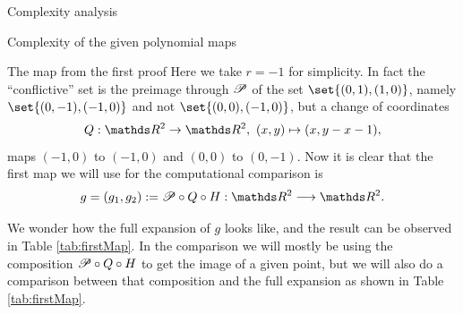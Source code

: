 \documentclass[11pt, a4paper, english, twoside, notitlepage, openright]{report}
\begin{document}
\begin{chapter}{Complexity analysis}
\begin{section}{Complexity of the given polynomial maps}
\begin{subsection}{The map from the first proof}
Here we take $r=-1$ for simplicity. In fact the ``conflictive'' set is the preimage through $\P$ of the set $\set{(0,1),(1,0)}$, namely $\set{(0,-1),(-1,0)}$ and not $\set{(0,0),(-1,0)}$, but a change of coordinates 
$$
Q:\R^2\to\R^2,\ (x,y)\mapsto(x,y-x-1),
$$
maps $(-1,0)$ to $(-1,0)$ and $(0,0)$ to $(0,-1)$. Now it is clear that the first map we will use for the computational comparison is
$$
g=(g_1, g_2):=\P\circ Q\circ H:\R^2\longrightarrow\R^2.
$$

We wonder how the full expansion of $g$ looks like, and the result can be observed in Table \ref{tab:firstMap}. In the comparison we will mostly be using the composition $\P\circ Q\circ H$ to get the image of a given point, but we will also do a comparison between that composition and the full expansion as shown in Table \ref{tab:firstMap}.


\end{subsection}
\end{section}
\end{chapter}
\end{document}
